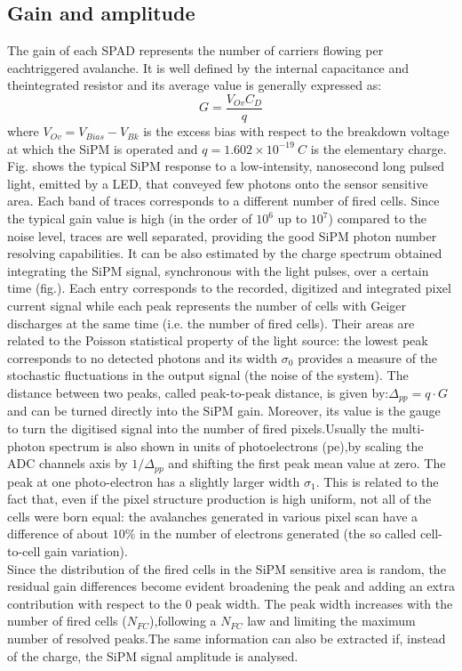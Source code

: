 \subsection*{Gain and amplitude}
The gain of each SPAD represents the number of carriers flowing per eachtriggered avalanche.   It is well defined by the internal capacitance and theintegrated resistor and its average value is generally expressed as:
\begin{equation}
	G = \frac{V_{Ov} C_D}{q}
\end{equation}
where $V_{Ov}=V_{Bias}-V_{Bk}$ is the excess bias with respect to the breakdown voltage at which the SiPM is operated and $q= 1.602\times 10^{-19}\ C$ is the elementary charge. Fig. shows the typical SiPM response to a low-intensity, nanosecond long pulsed light,  emitted by a LED, that conveyed few photons onto the sensor sensitive area. Each band of traces corresponds to a different number of fired cells. Since the typical gain value is high (in the order of $10^6$ up to $10^7$) compared to the noise level, traces are well separated, providing the good SiPM photon number resolving capabilities. It can be also estimated by the charge spectrum obtained integrating the SiPM signal, synchronous with the light pulses, over a certain time (fig.). Each entry corresponds to the recorded, digitized and integrated pixel current signal while each peak represents the number of cells with Geiger discharges at the same time (i.e. the number of fired cells). Their areas are related to the Poisson statistical property of the light source:  the lowest peak corresponds to no detected photons and its width $\sigma_0$ provides a measure of the stochastic fluctuations in the output signal (the noise of the system). The distance between two peaks, called peak-to-peak distance, is given by:$\Delta_{pp}= q \cdot G$ and can be turned directly into the SiPM gain.  Moreover, its value is the gauge to turn the digitised signal into the number of fired pixels.Usually the multi-photon spectrum is also shown in units of photoelectrons (pe),by scaling the ADC channels axis by $1/\Delta_{pp}$ and shifting the first peak mean value at zero. The peak at one photo-electron has a slightly larger width $\sigma_1$. This is related to the fact that, even if the pixel structure production is high uniform, not all of the cells were born equal: the avalanches generated in various pixel scan have a difference of about $10\%$ in the number of electrons generated (the so called cell-to-cell gain variation).\\
Since the distribution of the fired cells in the SiPM sensitive area is random, the residual gain differences become evident broadening the peak and adding an extra contribution with respect to the $0$ peak width. The peak width increases with the number of fired cells ($N_{FC}$),following a $N_{FC}$ law and limiting the maximum number of resolved peaks.The same information can also be extracted if, instead of the charge, the SiPM signal amplitude is analysed.\\

